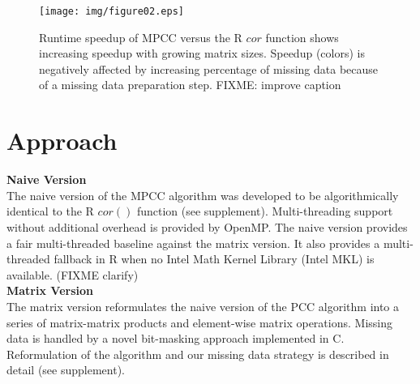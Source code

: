 \documentclass{bioinfo}
\begin{document}


\vspace*{-5mm}

\begin{figure}[!t]
  \centerline{\texttt{[image: img/figure02.eps]}}
  \vspace*{-7mm}
  \caption{
    Runtime speedup of MPCC versus the R $cor$ function shows
    increasing speedup with growing matrix sizes.
    Speedup (colors) is negatively affected by increasing percentage of
    missing data because of a
    missing data preparation step. FIXME: improve caption
  }
  \label{fig:fig2}
  \vspace*{-5mm}
\end{figure}

\section{Approach}

\textbf{Naive Version}\\
The naive version of the MPCC algorithm was developed to be
algorithmically identical to the R $cor()$ function (see supplement). Multi-threading support without additional overhead is provided by
OpenMP. The naive version provides a fair multi-threaded baseline
against the matrix version. It also provides a multi-threaded fallback
in R when no Intel\textregistered{} Math Kernel Library
(Intel\textregistered{} MKL) is available. (FIXME clarify)\\
\textbf{Matrix Version}\\
The matrix version reformulates the naive version of the PCC algorithm
into a series of matrix-matrix products and element-wise matrix operations.
Missing data is handled by a novel bit-masking approach implemented in C.
Reformulation of the algorithm and our missing data strategy is described
in detail (see supplement).

\vspace*{-5mm}
\end{document}
